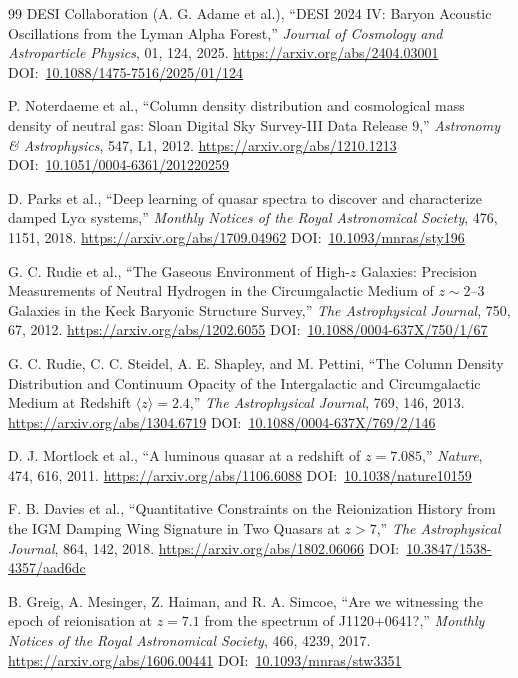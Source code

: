 \documentclass[10pt,onecolumn]{article}
\newcommand{\doi}[1]{DOI:~\href{https://doi.org/#1}{#1}}
\begin{document}
\begin{thebibliography}{99}
DESI Collaboration (A. G. Adame et al.),
``DESI 2024 IV: Baryon Acoustic Oscillations from the Lyman Alpha Forest,''
\emph{Journal of Cosmology and Astroparticle Physics}, 01, 124, 2025.
\url{https://arxiv.org/abs/2404.03001}
\doi{10.1088/1475-7516/2025/01/124}

P. Noterdaeme et al.,
``Column density distribution and cosmological mass density of neutral gas: Sloan Digital Sky Survey-III Data Release 9,''
\emph{Astronomy \& Astrophysics}, 547, L1, 2012.
\url{https://arxiv.org/abs/1210.1213}
\doi{10.1051/0004-6361/201220259}

D. Parks et al.,
``Deep learning of quasar spectra to discover and characterize damped Ly$\alpha$ systems,''
\emph{Monthly Notices of the Royal Astronomical Society}, 476, 1151, 2018.
\url{https://arxiv.org/abs/1709.04962}
\doi{10.1093/mnras/sty196}

G. C. Rudie et al.,
``The Gaseous Environment of High-$z$ Galaxies: Precision Measurements of Neutral Hydrogen in the Circumgalactic Medium of $z\sim2$--$3$ Galaxies in the Keck Baryonic Structure Survey,''
\emph{The Astrophysical Journal}, 750, 67, 2012.
\url{https://arxiv.org/abs/1202.6055}
\doi{10.1088/0004-637X/750/1/67}

G. C. Rudie, C. C. Steidel, A. E. Shapley, and M. Pettini,
``The Column Density Distribution and Continuum Opacity of the Intergalactic and Circumgalactic Medium at Redshift $\langle z\rangle=2.4$,''
\emph{The Astrophysical Journal}, 769, 146, 2013.
\url{https://arxiv.org/abs/1304.6719}
\doi{10.1088/0004-637X/769/2/146}

D. J. Mortlock et al.,
``A luminous quasar at a redshift of $z=7.085$,''
\emph{Nature}, 474, 616, 2011.
\url{https://arxiv.org/abs/1106.6088}
\doi{10.1038/nature10159}

F. B. Davies et al.,
``Quantitative Constraints on the Reionization History from the IGM Damping Wing Signature in Two Quasars at $z>7$,''
\emph{The Astrophysical Journal}, 864, 142, 2018.
\url{https://arxiv.org/abs/1802.06066}
\doi{10.3847/1538-4357/aad6dc}

B. Greig, A. Mesinger, Z. Haiman, and R. A. Simcoe,
``Are we witnessing the epoch of reionisation at $z=7.1$ from the spectrum of J1120+0641?,''
\emph{Monthly Notices of the Royal Astronomical Society}, 466, 4239, 2017.
\url{https://arxiv.org/abs/1606.00441}
\doi{10.1093/mnras/stw3351}


\end{thebibliography}
\end{document}
